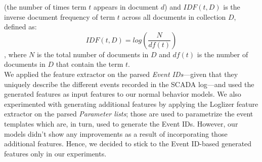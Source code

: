         (the number of times term $t$ appears in document $d$) and $IDF(t,D)$ is the inverse document frequency of term $t$ across all documents in collection $D$, defined as:
        \begin{equation}
          IDF(t,D) = log(\frac{N}{df(t)})
        \end{equation}
        , where $N$ is the total number of documents in $D$ and $df(t)$ is the number of documents in $D$ that contain the term $t$.\\
        We applied the feature extractor on the parsed \emph{Event IDs}---given that they uniquely describe the different events recorded in the SCADA log---and 
        used the generated features as input features to our normal behavior models. We also experimented with generating additional features by applying the Loglizer feature extractor 
        on the parsed \emph{Parameter lists}; those are used to parametrize the event templates which are, in turn, used to generate the Event IDs. 
        However, our models didn't show any improvements as a result of incorporating those additional features. Hence, we decided to stick to the Event ID-based 
        generated features only in our experiments.



\clearpage
